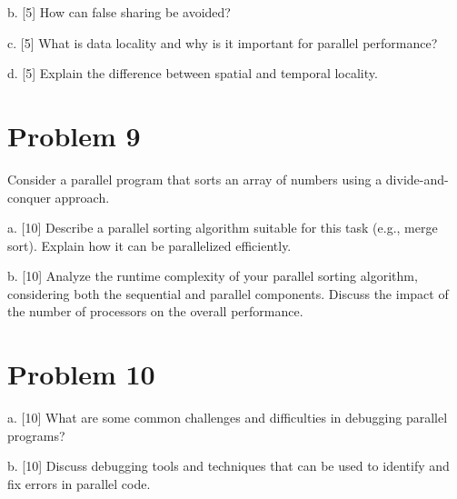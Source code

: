 \documentclass{article}
\begin{document}
b. [5] How can false sharing be avoided?

c. [5] What is data locality and why is it important for parallel performance?

d. [5] Explain the difference between spatial and temporal locality.


\section*{Problem 9}
Consider a parallel program that sorts an array of numbers using a divide-and-conquer approach.

a. [10] Describe a parallel sorting algorithm suitable for this task (e.g., merge sort).  Explain how it can be parallelized efficiently.

b. [10] Analyze the runtime complexity of your parallel sorting algorithm, considering both the sequential and parallel components. Discuss the impact of the number of processors on the overall performance.


\section*{Problem 10}
a. [10] What are some common challenges and difficulties in debugging parallel programs?

b. [10]  Discuss debugging tools and techniques that can be used to identify and fix errors in parallel code.
\end{document}
